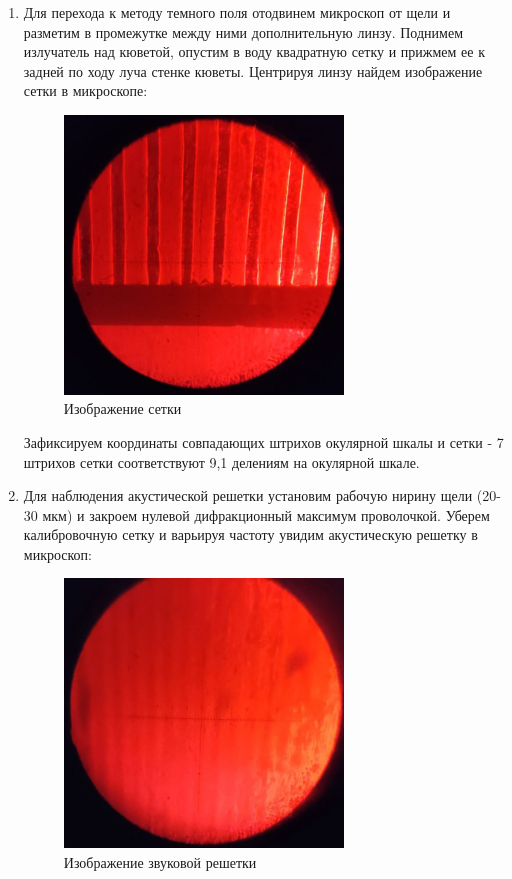 \documentclass[a4paper, 12pt]{article}%
\begin{document}
\begin{enumerate}
\item Для перехода к методу темного поля отодвинем микроскоп от щели и разметим в промежутке между ними дополнительную линзу. Поднимем излучатель над кюветой, опустим в воду квадратную сетку и прижмем ее к задней по ходу луча стенке кюветы. Центрируя линзу найдем изображение сетки в микроскопе:

\begin{figure}[h!]
    \centering	
    \includegraphics[width=0.7\textwidth]{images/2_1.jpg}
    \caption{Изображение сетки}
    \label{2_1}
\end{figure}

\newpage
Зафиксируем координаты совпадающих штрихов окулярной шкалы и сетки - 7 штрихов сетки соответствуют 9,1 делениям на окулярной шкале.

\item Для наблюдения акустической решетки установим рабочую нирину щели (20-30 мкм) и закроем нулевой дифракционный максимум проволочкой. Уберем калибровочную сетку и варьируя частоту увидим акустическую решетку в микроскоп:

\begin{figure}[h!]
    \centering	
    \includegraphics[width=0.7\textwidth]{images/3_1.jpg}
    \caption{Изображение звуковой решетки}
    \label{3_1}
\end{figure}

\end{enumerate}
\end{document}
